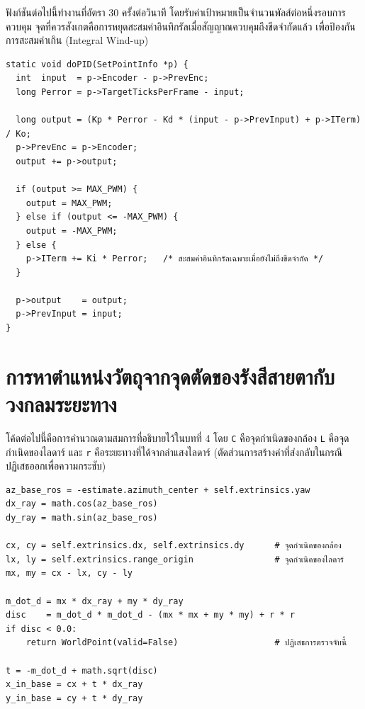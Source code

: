 \documentclass[a4paper,12pt]{report}
\begin{document}
ฟังก์ชันต่อไปนี้ทำงานที่อัตรา 30 ครั้งต่อวินาที
โดยรับค่าเป้าหมายเป็นจำนวนพัลส์ต่อหนึ่งรอบการควบคุม
จุดที่ควรสังเกตคือการหยุดสะสมค่าอินทิกรัลเมื่อสัญญาณควบคุมถึงขีดจำกัดแล้ว
เพื่อป้องกันการสะสมค่าเกิน (Integral Wind-up)

{\small
\begin{verbatim}
static void doPID(SetPointInfo *p) {
  int  input  = p->Encoder - p->PrevEnc;
  long Perror = p->TargetTicksPerFrame - input;

  long output = (Kp * Perror - Kd * (input - p->PrevInput) + p->ITerm) / Ko;
  p->PrevEnc = p->Encoder;
  output += p->output;

  if (output >= MAX_PWM) {
    output = MAX_PWM;
  } else if (output <= -MAX_PWM) {
    output = -MAX_PWM;
  } else {
    p->ITerm += Ki * Perror;   /* สะสมค่าอินทิกรัลเฉพาะเมื่อยังไม่ถึงขีดจำกัด */
  }

  p->output    = output;
  p->PrevInput = input;
}
\end{verbatim}
}

\section{การหาตำแหน่งวัตถุจากจุดตัดของรังสีสายตากับวงกลมระยะทาง}

โค้ดต่อไปนี้คือการคำนวณตามสมการที่อธิบายไว้ในบทที่ 4
โดย \texttt{C} คือจุดกำเนิดของกล้อง \texttt{L} คือจุดกำเนิดของไลดาร์
และ \texttt{r} คือระยะทางที่ได้จากลำแสงไลดาร์
(ตัดส่วนการสร้างค่าที่ส่งกลับในกรณีปฏิเสธออกเพื่อความกระชับ)

\noindent\begin{minipage}{\textwidth}
{\small
\begin{verbatim}
az_base_ros = -estimate.azimuth_center + self.extrinsics.yaw
dx_ray = math.cos(az_base_ros)
dy_ray = math.sin(az_base_ros)

cx, cy = self.extrinsics.dx, self.extrinsics.dy      # จุดกำเนิดของกล้อง
lx, ly = self.extrinsics.range_origin                # จุดกำเนิดของไลดาร์
mx, my = cx - lx, cy - ly

m_dot_d = mx * dx_ray + my * dy_ray
disc    = m_dot_d * m_dot_d - (mx * mx + my * my) + r * r
if disc < 0.0:
    return WorldPoint(valid=False)                   # ปฏิเสธการตรวจจับนี้

t = -m_dot_d + math.sqrt(disc)
x_in_base = cx + t * dx_ray
y_in_base = cy + t * dy_ray
\end{verbatim}
}
\end{minipage}
\end{document}
